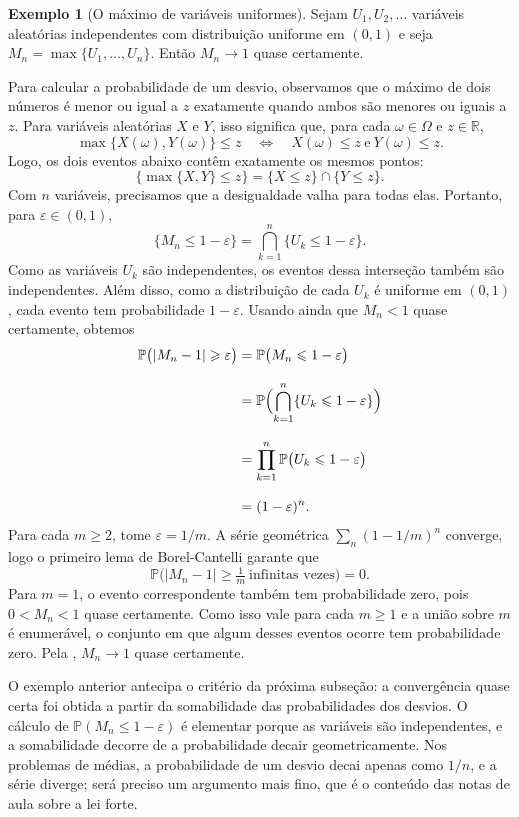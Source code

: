 \documentclass[12pt,portuguese]{article}
\theoremstyle{definition}
\newtheorem{example}[example]{Exemplo}
\theoremstyle{plainexercise}
\theoremstyle{starredexercise}
\theoremstyle{definition}
\begin{document}
\begin{example}[O máximo de variáveis uniformes]\label{ex:qc-maximo}
Sejam $U_1,U_2,\ldots$ variáveis aleatórias independentes com distribuição
uniforme em $(0,1)$ e seja $M_n=\max\{U_1,\ldots,U_n\}$. Então
$M_n\to1$ quase certamente.

Para calcular a probabilidade de um desvio, observamos que o máximo de dois
números é menor ou igual a $z$ exatamente quando ambos são menores ou iguais
a $z$. Para variáveis aleatórias $X$ e $Y$, isso significa que, para cada
$\omega\in\Omega$ e $z\in\mathbb{R}$,
\[
\max\{X(\omega),Y(\omega)\}\leqslant z
\quad\Longleftrightarrow\quad
X(\omega)\leqslant z\ \text{e}\ Y(\omega)\leqslant z.
\]
Logo, os dois eventos abaixo contêm exatamente os mesmos pontos:
\[
\bigl\{\max\{X,Y\}\leqslant z\bigr\}
=\{X\leqslant z\}\cap\{Y\leqslant z\}.
\]
Com $n$ variáveis, precisamos que a desigualdade valha para todas elas.
Portanto, para $\varepsilon\in(0,1)$,
\[
\{M_n\leqslant1-\varepsilon\}
=\bigcap_{k=1}^{n}\{U_k\leqslant1-\varepsilon\}.
\]
Como as variáveis $U_k$ são independentes, os eventos dessa interseção também
são independentes. Além disso, como a distribuição de cada $U_k$ é uniforme
em $(0,1)$, cada evento tem probabilidade $1-\varepsilon$. Usando ainda que
$M_n<1$ quase certamente, obtemos
\begin{align*}
\mathbb{P}\bigl(|M_n-1|\geqslant\varepsilon\bigr)
&=\mathbb{P}\bigl(M_n\leqslant1-\varepsilon\bigr)
\\[0.3cm]
&=\mathbb{P}\Bigl(\bigcap_{k=1}^{n}
\{U_k\leqslant1-\varepsilon\}\Bigr)
\\[0.3cm]
&=\prod_{k=1}^{n}\mathbb{P}\bigl(U_k\leqslant1-\varepsilon\bigr)
\\[0.3cm]
&=(1-\varepsilon)^n.
\end{align*}
Para cada $m\geqslant2$, tome $\varepsilon=1/m$. A série geométrica
$\sum_n(1-1/m)^n$ converge, logo o primeiro lema de Borel-Cantelli garante que
\[
\mathbb{P}\bigl(|M_n-1|\geqslant\tfrac{1}{m}\ \text{infinitas vezes}\bigr)=0.
\]
Para $m=1$, o evento correspondente também tem probabilidade zero, pois
$0<M_n<1$ quase certamente. Como isso vale para cada $m\geqslant1$ e a união
sobre $m$ é enumerável, o conjunto em que algum desses eventos ocorre tem
probabilidade zero. Pela , $M_n\to1$ quase
certamente.
\end{example}

O exemplo anterior antecipa o critério da próxima subseção: a convergência
quase certa foi obtida a partir da somabilidade das probabilidades dos desvios.
O cálculo de $\mathbb{P}(M_n\leqslant1-\varepsilon)$ é elementar porque as
variáveis são independentes, e a somabilidade decorre de a probabilidade decair
geometricamente. Nos problemas de médias, a probabilidade de um desvio decai
apenas como $1/n$, e a série diverge; será preciso um argumento mais fino, que
é o conteúdo das notas de aula sobre a lei forte.
\end{document}
